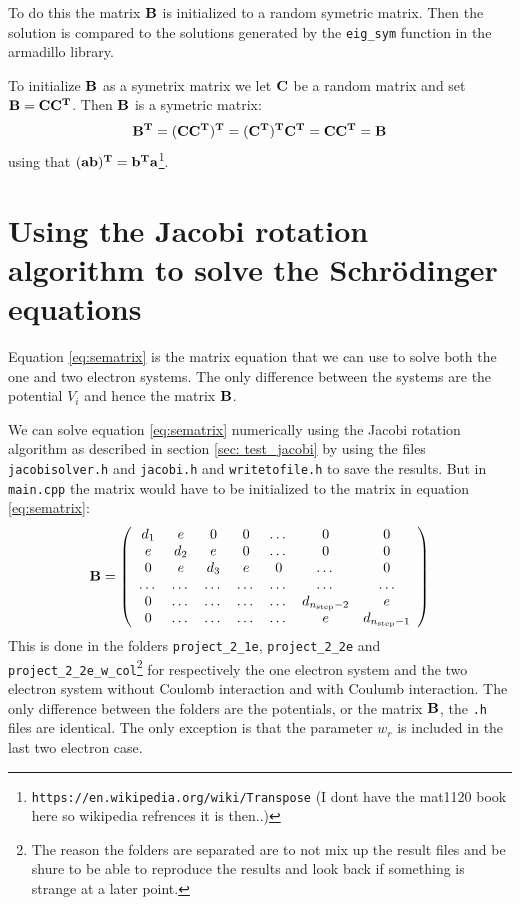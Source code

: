 \documentclass[11pt,a4wide]{article}
\begin{document}
To do this the matrix $\bf B$ is initialized to a random symetric matrix. Then the solution is compared to the solutions generated by the \texttt{eig\_sym} function in the armadillo library.

To initialize $\bf B$ as a symetrix matrix we let $\bf C$ be a random matrix and set $\bf B = \bf{CC^T}$. Then $\bf B$ is a symetric matrix:
\[
\bf { B^T = (CC^T)^T = (C^T)^TC^T = CC^T = B}
\]
using that $\bf{ (ab)^T = b^Ta}$\footnote{\texttt{https://en.wikipedia.org/wiki/Transpose} (I dont have the mat1120 book here so wikipedia refrences it is then..)}. 

\section{Using the Jacobi rotation algorithm to solve the Schr\"odinger equations}

Equation \ref{eq:sematrix} is the matrix equation that we can use to solve both the one and two electron systems. The only difference between the systems are the potential $V_i$ and hence the matrix $\bf B$.

We can solve equation \ref{eq:sematrix} numerically using the Jacobi rotation algorithm as described in section \ref{sec: test_jacobi} by using the files \texttt{jacobisolver.h} and \texttt{jacobi.h} and \texttt{writetofile.h} to save the results. But in \texttt{main.cpp} the matrix would have to be initialized to the matrix in equation \ref{eq:sematrix}:
\[
\bf B = \left( \begin{array}{ccccccc} d_1 & e & 0   & 0    & \dots  &0     & 0 \\
                                e & d_2 & e & 0    & \dots  &0     &0 \\
                                0   & e & d_3 & e  &0       &\dots & 0\\
                                \dots  & \dots & \dots & \dots  &\dots      &\dots & \dots\\
                                0   & \dots & \dots & \dots  &\dots       &d_{n_{\mathrm{step}}-2} & e\\
                                0   & \dots & \dots & \dots  &\dots       &e & d_{n_{\mathrm{step}}-1}

             \end{array} \right)
\]
This is done in the folders \texttt{project\_2\_1e}, \texttt{project\_2\_2e} and \texttt{project\_2\_2e\_w\_col}\footnote{The reason the folders are separated are to not mix up the result files and be shure to be able to reproduce the results and look back if something is strange at a later point.} for respectively the one electron system and the two electron system without Coulomb interaction and with Coulumb interaction. The only difference between the folders are the potentials, or the matrix $\bf B$, the \texttt{.h} files are identical. The only exception is that the parameter $w_r$ is included in the last two electron case. 
\end{document}
